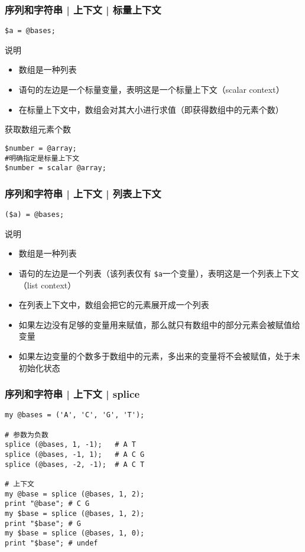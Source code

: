 \begin{frame}[fragile]
  \frametitle{序列和字符串 | 上下文 | \alert{标量上下文}}
  \vspace{-1.5em}
\begin{lstlisting}
$a = @bases;
\end{lstlisting}
\pause
\begin{block}{说明}
  \begin{itemize}
    \item 数组是一种列表
    \item 语句的左边是一个标量变量，表明这是一个标量上下文（scalar context）
    \item 在标量上下文中，数组会对其大小进行求值（即获得数组中的元素个数）
  \end{itemize}
\end{block}
\pause
\begin{block}{获取数组元素个数}
  \vspace{-1.5em}
\begin{lstlisting}
$number = @array;
#明确指定是标量上下文
$number = scalar @array;
\end{lstlisting}
\end{block}
\end{frame}

\begin{frame}[fragile]
  \frametitle{序列和字符串 | 上下文 | \alert{列表上下文}}
  \vspace{-1.5em}
\begin{lstlisting}
($a) = @bases;
\end{lstlisting}
\pause
\begin{block}{说明}
  \begin{itemize}
    \item 数组是一种列表
    \item 语句的左边是一个列表（该列表仅有 \verb|$a|一个变量），表明这是一个列表上下文（list context）
    \item 在列表上下文中，数组会把它的元素展开成一个列表
    \item 如果左边没有足够的变量用来赋值，那么就只有数组中的部分元素会被赋值给变量
    \item 如果左边变量的个数多于数组中的元素，多出来的变量将不会被赋值，处于未初始化状态
  \end{itemize}
\end{block}
\end{frame}

\begin{frame}[fragile]
  \frametitle{序列和字符串 | 上下文 | splice}
  \vspace{-1.5em}
\begin{lstlisting}
my @bases = ('A', 'C', 'G', 'T');

# 参数为负数
splice (@bases, 1, -1);   # A T
splice (@bases, -1, 1);   # A C G
splice (@bases, -2, -1);  # A C T

# 上下文
my @base = splice (@bases, 1, 2);
print "@base"; # C G
my $base = splice (@bases, 1, 2);
print "$base"; # G
my $base = splice (@bases, 1, 0);
print "$base"; # undef
\end{lstlisting}
\end{frame}

